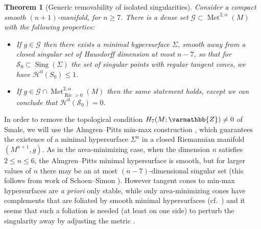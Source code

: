 \documentclass[12pt,twoside]{amsart}
\numberwithin{equation}{section}
\renewcommand{\leq}{\leqslant}
\renewcommand{\geq}{\geqslant}
\renewcommand{\mathbb}{\varmathbb}
\newtheorem{theorem}{Theorem}[section]
\newcommand{\cC}{\mathcal C}
\newcommand{\cG}{\mathcal G}
\renewcommand{\cH}{\mathcal H}
\renewcommand{\cR}{\mathcal R}
\newcommand{\cS}{\mathcal S}
\DeclareMathOperator{\Ric}{Ric}
\DeclareMathOperator{\sing}{Sing}
\DeclareMathOperator{\Met}{Met}
\begin{document}
\begin{theorem}[Generic removability of isolated singularities]\label{thm:generic_stratum}
Consider a compact smooth $(n+1)$-manifold, for $n\geq 7$. There is a dense set $\cG\subset \Met^{2,\alpha}(M)$ with the following properties:
\begin{itemize}
\item If $g\in\cG$ then there exists a minimal hypersurface $\Sigma$, smooth away from a closed singular set of Hausdorff dimension at most $n-7$, so that for $\cS_0 \subset \sing(\Sigma)$ the set of singular points with regular tangent cones, we have $\cH^0(S_0) \leq 1$. 
\item If $g \in \cG \cap \Met^{2,\alpha}_{\Ric>0}(M)$ then the same statement holds, except we can conclude that $\cH^0(\cS_0) = 0$. 
\end{itemize}
%	
\end{theorem}


 \medskip

In order to remove the topological condition $H_7(M; \mathbb{Z}) \neq 0$ of Smale, we will use the Almgren--Pitts min-max construction \cite{Pitts}, which guarantees the existence of a minimal hypersurface $\Sigma^n$ in a closed Riemannian manifold $(M^{n+1},g)$. As in the area-minimizing case, when the dimension $n$ satisfies $2\leq n \leq 6$, the Almgren--Pitts minimal hypersurface is smooth, but for larger values of $n$ there may be an at most $(n-7)$-dimensional singular set (this follows from work of Schoen--Simon \cite{SS}). However tangent cones to min-max hypersurfaces are \emph{a priori} only stable, while only area-minimizing cones have complements that are foliated by smooth minimal hypersurfaces (cf.\ \cite{BDG, Lawlor}) and it seems that such a foliation is needed (at least on one side) to perturb the singularity away by adjusting the metric  \cite{HS}.
\end{document}
